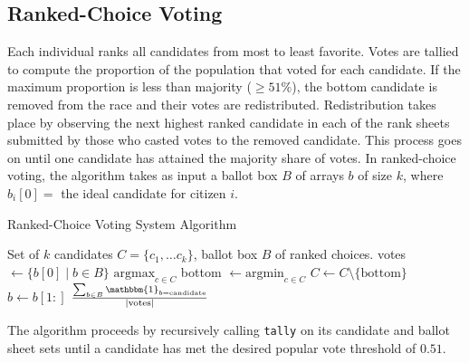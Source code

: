 \subsection{Ranked-Choice Voting}
Each individual ranks all candidates from most to least favorite.
Votes are tallied to compute the proportion of the population that voted for each candidate.
If the maximum proportion is less than majority ($\geq 51\%$), the bottom candidate is removed from the race and their votes are redistributed.
Redistribution takes place by observing the next highest ranked candidate in each of the rank sheets submitted by those who casted votes
to the removed candidate. This process goes on until one candidate has attained the majority share of votes. \newline
\indent In ranked-choice voting, the algorithm takes as input a ballot box $B$ of arrays $b$ of size $k$, where $b_i[0] = $ the ideal candidate for 
citizen $i$.
\begin{algorithm}[H]
\caption{Ranked-Choice Voting System Algorithm}\label{alg:ranked}
\begin{algorithmic}
    \Require Set of $k$ candidates $C=\{c_1, \ldots c_k\}$, ballot box $B$ of ranked choices.
        \State votes $\leftarrow \{b[0] \mid b \in B\}$
            \State \Return $\mathrm{argmax}_{c \in C}$ 
        \Else
            \State bottom $\leftarrow \mathrm{argmin}_{c \in C}$ 
            \State $C \leftarrow C \setminus \{\mathrm{bottom}\}$
                    \State $b \leftarrow b[1:]$ 
                \EndIf
            \EndFor
        \EndIf
    \EndFunction
        \State \Return $\frac{\sum_{b \in B}\mathbbm{1}_{b = \mathrm{candidate}}}{|\mathrm{votes}|}$
    \EndFunction
\end{algorithmic}
\end{algorithm}
The algorithm proceeds by recursively calling \texttt{tally} on its candidate and ballot sheet sets until a candidate has met
the desired popular vote threshold of $0.51$.
